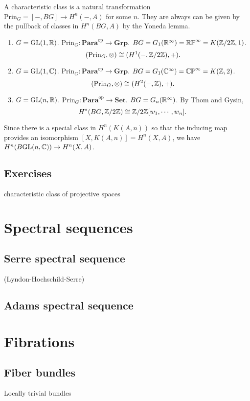 \documentclass{../../large}
\begin{document}
A characteristic class is a natural transformation $\mathrm{Prin}_G=[-,BG]\to H^n(-,A)$ for some $n$.
They are always can be given by the pullback of classes in $H^n(BG,A)$ by the Yoneda lemma.
\begin{enumerate}
\item $G=\mathrm{GL}(1,\mathbb{R})$. $\mathrm{Prin}_G:\mathbf{Para}^{\mathrm{op}}\to\mathbf{Grp}$. $BG=G_1(\mathbb{R}^\infty)=\mathbb{RP}^\infty=K(\mathbb{Z}/2\mathbb{Z},1)$.
\[(\mathrm{Prin}_G,\otimes)\cong(H^1(-,\mathbb{Z}/2\mathbb{Z}),+).\]
\item $G=\mathrm{GL}(1,\mathbb{C})$. $\mathrm{Prin}_G:\mathbf{Para}^{\mathrm{op}}\to\mathbf{Grp}$. $BG=G_1(\mathbb{C}^\infty)=\mathbb{CP}^\infty=K(\mathbb{Z},2)$.
\[(\mathrm{Prin}_G,\otimes)\cong(H^2(-,\mathbb{Z}),+).\]
\item $G=\mathrm{GL}(n,\mathbb{R})$. $\mathrm{Prin}_G:\mathbf{Para}^{\mathrm{op}}\to\mathbf{Set}$. $BG=G_n(\mathbb{R}^\infty)$. By Thom and Gysin,
\[H^*(BG,\mathbb{Z}/2\mathbb{Z})\cong\mathbb{Z}/2\mathbb{Z}[w_1,\cdots,w_n].\]
\end{enumerate}



Since there is a special class in $H^n(K(A,n))$ so that the inducing map provides an isomorphism $[X,K(A,n)]=H^n(X,A)$, we have $H^n(B\mathrm{GL}(n,\mathbb{C}))\to H^n(X,A)$.


\section*{Exercises}

characteristic class of projective spaces





\chapter{Spectral sequences}
\section{Serre spectral sequence}
	(Lyndon-Hochschild-Serre)
\section{Adams spectral sequence}






\chapter{Fibrations}

\section{Fiber bundles}
Locally trivial bundles
\end{document}
